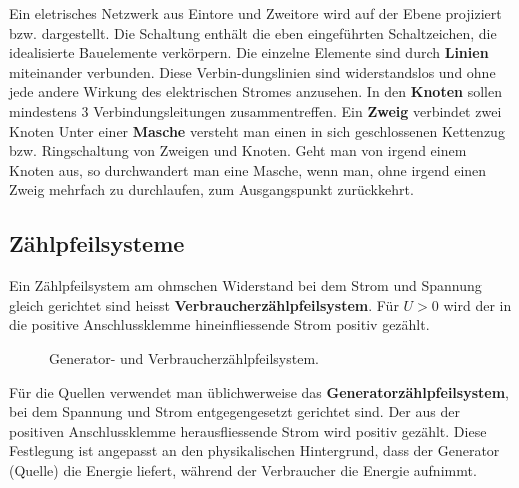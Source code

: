 \noindent Ein eletrisches Netzwerk aus Eintore und Zweitore wird auf der Ebene projiziert bzw. dargestellt. Die Schaltung enthält die eben eingeführten Schaltzeichen, die idealisierte Bauelemente verkörpern.
\newline\newline
Die einzelne Elemente sind durch \textbf{Linien} miteinander verbunden. Diese Verbin-dungslinien sind widerstandslos und ohne jede andere Wirkung des elektrischen Stromes anzusehen.
\newline\newline
In den \textbf{Knoten} sollen mindestens 3 Verbindungsleitungen zusammentreffen. Ein \textbf{Zweig} verbindet zwei Knoten
\newline\newline
Unter einer \textbf{Masche} versteht man einen in sich geschlossenen Kettenzug bzw. Ringschaltung von Zweigen und Knoten. Geht man von irgend einem Knoten aus, so durchwandert man eine Masche, wenn man, ohne irgend einen Zweig mehrfach zu durchlaufen, zum Ausgangspunkt zurückkehrt.
\subsection{Zählpfeilsysteme}
Ein Zählpfeilsystem am ohmschen Widerstand bei dem Strom und Spannung gleich gerichtet sind heisst \textbf{Verbraucherzählpfeilsystem}. Für $U>0$ wird der in die positive Anschlussklemme hineinfliessende Strom positiv gezählt.
\begin{figure}[H]
\centering
\caption{Generator- und Verbraucherzählpfeilsystem.}
\label{fig_IIIe}
\end{figure}
\noindent Für die Quellen verwendet man üblichwerweise das \textbf{Generatorzählpfeilsystem}, bei dem Spannung und Strom entgegengesetzt gerichtet sind. Der aus der positiven Anschlussklemme herausfliessende Strom wird positiv gezählt. Diese Festlegung ist angepasst an den physikalischen Hintergrund, dass der Generator (Quelle) die Energie liefert, während der Verbraucher die Energie aufnimmt.
